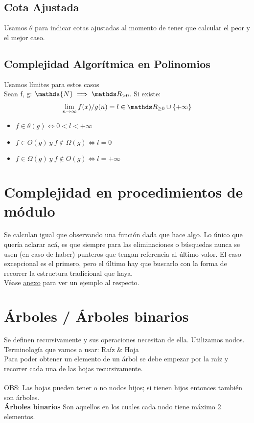 \documentclass[10pt,a4paper]{article}
\begin{document}
\subsection*{Cota Ajustada}
Usamos \(\theta\) para indicar cotas ajustadas al momento de tener que calcular el peor y el mejor caso.
\subsection*{Complejidad Algorítmica en Polinomios}
Usamos límites para estos casos \\

Sean f, g: \(\mathds{N} \implies \float_{>0}\). Si existe:
\[ \lim_{n\to\infty} f(x)/g(n) = l \in \float_{\ge 0} \cup \{ +\infty \} \]
\begin{itemize}
    \item \(f \in \theta(g) \iff 0<l<+\infty\)
    \item \(f \in O(g) \ y \ f \notin \Omega(g) \iff l = 0\)
    \item \(f \in \Omega(g) \ y \ f \notin O(g) \iff l = +\infty\)
\end{itemize}
\section*{Complejidad en procedimientos de módulo}
Se calculan igual que observando una función dada que hace algo. Lo único que quería aclarar acá, es que siempre para las eliminaciones o búsquedas nunca se usen (en caso de haber) punteros que tengan referencia al último valor. El caso excepcional es el primero, pero el último hay que buscarlo con la forma de recorrer la estructura tradicional que haya. \\
Véase \hyperref[subsec:complejidad_modulo_sll]{anexo} para ver un ejemplo al respecto.
\section*{Árboles / Árboles binarios}
Se definen recursivamente y sus operaciones necesitan de ella. Utilizamos nodos. \\
Terminología que vamos a usar: Raíz \& Hoja \\ 
Para poder obtener un elemento de un árbol se debe empezar por la raíz y recorrer cada una de las hojas recursivamente. \\ \\
OBS: Las hojas pueden tener o no nodos hijos; si tienen hijos entonces también son árboles.  \\ 
\textbf{Árboles binarios}
Son aquellos en los cuales cada nodo tiene máximo 2 elementos.
\end{document}
